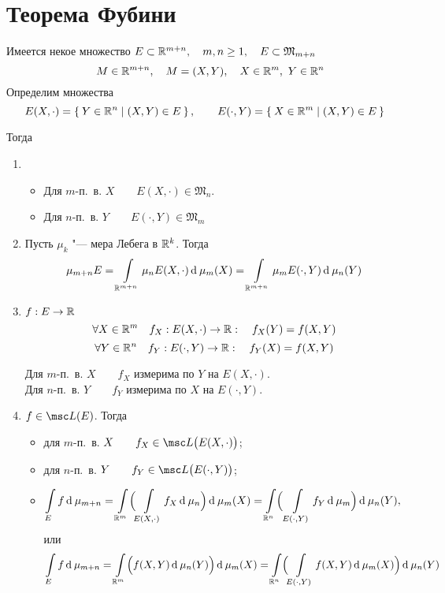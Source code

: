 \begin{noproof}
\end{noproof}

\section{Теорема Фубини}

\begin{theorem}
	Имеется некое множество $ E \subset \mathbb{R}^{m + n}, \quad m, n \ge 1, \quad E \subset \mathfrak M_{m + n} $
	$$ \quad M \in \mathbb{R}^{m + n}, \quad M = (X, Y), \quad X \in \mathbb{R}^m, ~ Y \in \mathbb{R}^n $$
	Определим множества
	$$ E (X, \cdot) = \Set{ Y \in \ensuremath{\mathbb{R}}^n \mid (X, Y) \in E}, \qquad E(\cdot, Y) = \Set{X \in \ensuremath{\mathbb{R}}^m \mid (X, Y) \in E} $$

	Тогда
	\begin{enumerate}
		\item
			\begin{itemize}
			\item Для $ m $-п.~в. $ X \qquad E(X, \cdot) \in \mathfrak M_n $.
			\item Для $ n $-п.~в. $ Y \qquad E(\cdot, Y) \in \mathfrak M_m $
		\end{itemize}
		\item Пусть $ \mu_k $ "--- мера Лебега в $ \mathbb{R}^k $. Тогда
			$$ \mu_{m + n} E = \int\limits_{\mathbb{R}^{m + n}} \mu_n E(X, \cdot) \operatorname{d}^{} \mu_m(X) = \int\limits_{\mathbb{R}^{m + n}} \mu_m E(\cdot, Y) \operatorname{d}^{} \mu_n(Y) $$
		\item $ f : E \to \mathbb{R} $
			$$ \forall X \in \mathbb{R}^m \quad f_X : E(X, \cdot) \to \mathbb{R} : \quad f_X(Y) = f(X, Y) $$
			$$ \forall Y \in \mathbb{R}^n \quad f_Y : E(\cdot, Y) \to \mathbb{R} : \quad f_Y(X) = f(X, Y) $$

			Для $ m $-п.~в. $ X \qquad f_X $ измерима по $ Y $ на $ E(X, \cdot) $. \\
			Для $ n $-п.~в. $ Y \qquad f_Y $ измерима по $ X $ на $ E(\cdot, Y) $.
			
		\item $ f \in \msc L(E) $. Тогда
			\begin{itemize}
				\item для $ m $-п.~в. $ X \qquad f_X \in \msc L \bigl( E(X, \cdot) \bigr) $;
				\item для $ n $-п.~в. $ Y \qquad f_Y \in \msc L \bigl( E(\cdot, Y) \bigr) $;
				\item
					$$ \int\limits_E f \operatorname{d}^{} \mu_{m + n} = \int\limits_{\mathbb{R}^m} \Bigl( \int\limits_{E(X, \cdot)} f_X \operatorname{d}^{} \mu_n \Bigr) \operatorname{d}^{} \mu_m(X) = \int\limits_{\mathbb{R}^n} \Bigr(\int\limits_{E(\cdot, Y)} f_Y \operatorname{d}^{} \mu_m \Bigr) \operatorname{d}^{} \mu_n(Y), $$
					или
					$$ \int\limits_E f \operatorname{d}^{} \mu_{m + n} = \int\limits_{\mathbb{R}^m} \Bigl( f(X, Y) \operatorname{d}^{} \mu_n(Y) \Bigr) \operatorname{d}^{} \mu_m(X) = \int\limits_{\mathbb{R}^n} \Bigl( \int\limits_{E(\cdot, Y)} f(X, Y) \operatorname{d}^{} \mu_m(X) \Bigr) \operatorname{d}^{} \mu_n(Y) $$
			\end{itemize}
	\end{enumerate}
\end{theorem}

